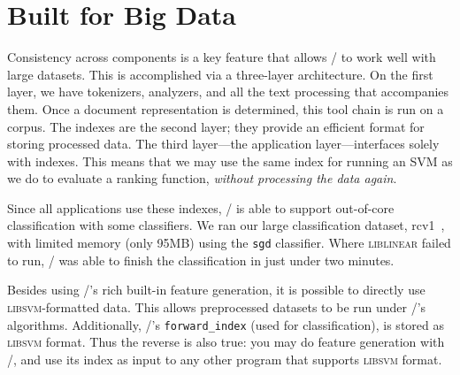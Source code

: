 \section{Built for Big Data}

Consistency across components is a key feature that allows \meta/ to work
well with large datasets. This is accomplished via a three-layer architecture.
On the first layer, we have tokenizers, analyzers, and all the text processing
that accompanies them. Once a document representation is determined, this tool
chain is run on a corpus. The indexes are the second layer; they provide an
efficient format for storing processed data. The third layer---the application
layer---interfaces solely with indexes. This means that we may use the same
index for running an SVM as we do to evaluate a ranking function, \emph{without
processing the data again}.

Since all applications use these indexes, \meta/ is able to support
out-of-core classification with some classifiers. We ran our large
classification dataset, rcv1~\cite{rcv1}, with limited memory (only 95MB) using
the \texttt{sgd} classifier. Where \textsc{liblinear} failed to run,
\meta/ was able to finish the classification in just under two minutes.

Besides using \meta/'s rich built-in feature generation, it is possible to
directly use \textsc{libsvm}-formatted data. This allows preprocessed datasets
to be run under \meta/'s algorithms. Additionally, \meta/'s
\texttt{forward\_index} (used for classification), is stored as \textsc{libsvm}
format. Thus the reverse is also true: you may do feature generation with
\meta/, and use its index as input to any other program that supports
\textsc{libsvm} format.
